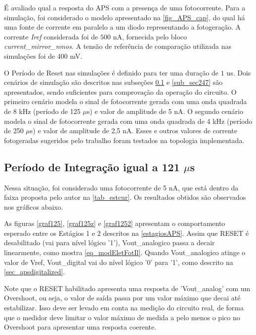 É avaliado qual a resposta do APS com a presença de uma fotocorrente. Para a simulação, foi considerado o modelo apresentado na \autoref{fig_APS_cap}, do qual há uma fonte de corrente em paralelo a um diodo representando a fotogeração. A corrente \textit{Iref} considerada foi de $500$ nA, fornecida pelo bloco \textit{current\_mirror\_nmos}. A tensão de referência de comparação utilizada nas simulações foi de 400 mV.

O Período de Reset nas simulações é definido para ter uma duração de $1$ us. Dois cenários de simulação são descritos nas subseções \ref{sub_sec121} e \ref{sub_sec247} são apresentados, sendo suficientes para comprovação da operação do circuito. O primeiro cenário modela o sinal de fotocorrente gerada com uma onda quadrada de 8 kHz (período de 125 $\mu$s) e valor de amplitude de 5 nA. O segundo cenário modela o sinal de fotocorrente gerada com uma onda quadrada de 4 kHz (período de 250 $\mu$s) e valor de amplitude de 2,5 nA. Esses e outros valores de corrente fotogeradas sugeridos pelo trabalho \cite{LidianeCampos} foram testados na topologia implementada.

\subsection{Período de Integração igual a 121 $\mu$s}
\label{sub_sec121}

Nessa situação, foi considerado uma fotocorrente de 5 nA, que está dentro da faixa proposta pelo autor na \autoref{tab_estcur}. Os resultados obtidos são observados nos gráficos abaixo.

As figuras \ref{graf125}, \ref{graf125z} e \ref{graf1252} apresentam o comportamento esperado entre os Estágios 1 e 2 descritos na \autoref{estagiosAPS}. Assim que RESET é desabilitado (vai para nível lógico '1'), Vout\_analogico passa a decair linearmente, como mostra \autoref{eq_modEletFotIl}. Quando Vout\_analogico atinge o valor de Vref, Vout\_digital vai do nível lógico '0' para '1', como descrito na \autoref{sec_apsdigitalized}.

Note que o RESET habilitado apresenta uma resposta de 'Vout\_analog' com um Overshoot, ou seja, o valor de saída passa por um valor máximo que decai até estabilizar. Isso deve ser levado em conta na medição do circuito real, de forma que o medidor deve limitar o valor máximo de medida a pelo menos o pico no Overshoot para apresentar uma resposta coerente.

